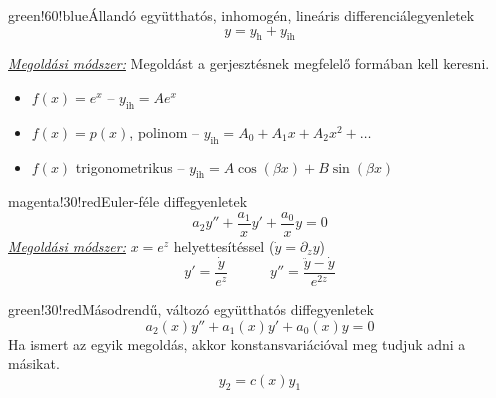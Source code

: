 \documentclass[main.tex]{subfiles}
\begin{document}
\begin{cbox}{green!60!blue}{Állandó együtthatós, inhomogén, lineáris differenciálegyenletek}
  \[
    y = y_\mathrm{h} + y_\mathrm{ih}
  \]

  \emph{\underline{Megoldási módszer:}} \quad
  Megoldást a gerjesztésnek megfelelő
  formában kell keresni.
  \begin{itemize}
    \item $f(x) = e^x$
          \tabto{4.6cm} – \tabto{5.2cm}
          $y_\mathrm{ih} = A e^x$

    \item $f(x) = p(x)$, polinom
          \tabto{4.6cm} – \tabto{5.2cm}
          $y_\mathrm{ih} = A_0 + A_1 x + A_2 x^2 + \dots$

    \item $f(x)$ trigonometrikus
          \tabto{4.6cm} – \tabto{5.2cm}
          $y_\mathrm{ih} = A \cos (\beta x) + B \sin (\beta x)$
  \end{itemize}
\end{cbox}

\begin{cbox}{magenta!30!red}{Euler-féle diffegyenletek}
  \[
    a_2 y'' + \frac{a_1}{x} y' + \frac{a_0}{x} y = 0
  \]
  \emph{\underline{Megoldási módszer:}}
  \quad $x = e^z$ helyettesítéssel
  \quad ($\dot{y} = \partial_z y$)
  \[
    y'  = \frac{\dot{y}}{e^{z}}
    \quad\quad\quad
    y'' = \frac{\ddot{y} - \dot{y}}{e^{2z}}
  \]
\end{cbox}

\begin{cbox}{green!30!red}{Másodrendű, változó együtthatós diffegyenletek}
  \[
    a_2(x) y'' + a_1(x) y' + a_0(x) y = 0
  \]
  Ha ismert az egyik megoldás, akkor konstansvariációval
  meg tudjuk adni a másikat.
  \[
    y_2 = c(x) y_1
  \]
\end{cbox}
\end{document}
